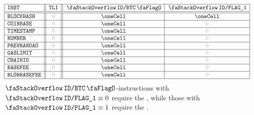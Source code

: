 \[
	\begin{array}{|l||c||c|c|}
		\hline
		\INST              & \tli  & \stackDecBtcFlag & \decFlag{1} \\ \hline\hline
		\inst{BLOCKHASH}   & \zero & \oneCell         & \oneCell    \\ \hline
		\inst{COINBASE}    & \zero & \oneCell         & \zero       \\ \hline
		\inst{TIMESTAMP}   & \zero & \oneCell         & \zero       \\ \hline
		\inst{NUMBER}      & \zero & \oneCell         & \zero       \\ \hline
		\inst{PREVRANDAO}  & \zero & \oneCell         & \zero       \\ \hline
		\inst{GASLIMIT}    & \zero & \oneCell         & \zero       \\ \hline
		\inst{CHAINID}     & \zero & \oneCell         & \zero       \\ \hline
		\inst{BASEFEE}     & \zero & \oneCell         & \zero       \\ \hline
		\inst{BLOBBASEFEE} & \zero & \oneCell         & \zero       \\ \hline
	\end{array}
\]
\saNote{}
$\stackDecBtcFlag$-instructions with
$\decFlag{1} \equiv 0$ require the \zeroOneSP{}, while those with
$\decFlag{1} \equiv 1$ require the \oneOneSP{}.
